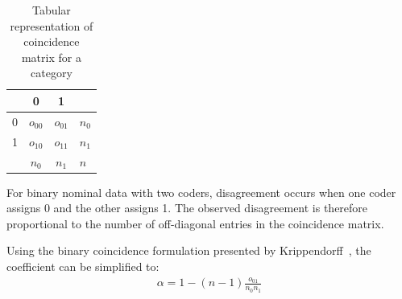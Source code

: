 \begin{table}
    \centering
    \caption{Tabular representation of coincidence matrix for a category}
    \label{coincidence_matrix}
    \begin{tabular}{l|cc|l}
            & 0 & 1 & \\
            \hline
            0 & $o_{00}$ & $o_{01}$ & $n_0$ \\
            1 & $o_{10}$ & $o_{11}$ & $n_1$ \\
            \hline
            & $n_0$ & $n_1$ & $n$
    \end{tabular}
\end{table}

For binary nominal data with two coders, disagreement occurs
when one coder assigns 0 and the other assigns 1. The observed
disagreement is therefore proportional to the number of off-diagonal
entries in the coincidence matrix.

Using the binary coincidence formulation presented by
Krippendorff\ \cite{krippendorff_content_2004}, the coefficient
can be simplified to:
\begin{align}
    \alpha = 1 - (n-1)\frac{o_{01}}{n_0 n_1}
\end{align}